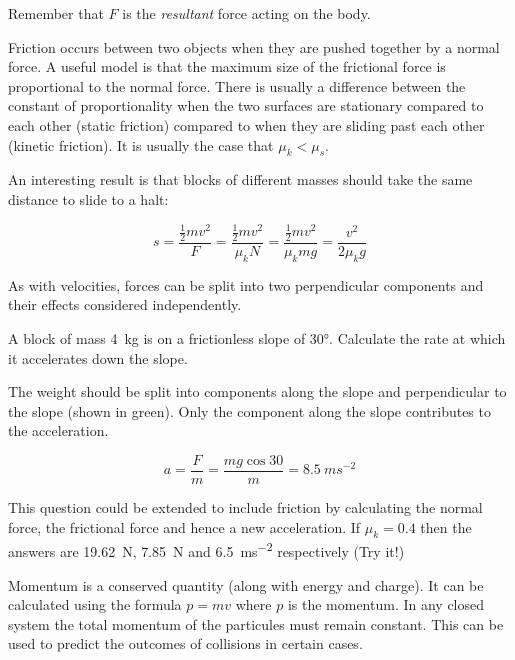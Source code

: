 \documentclass[main.tex]{subfiles}
\begin{document}

Remember that $F$ is the \emph{resultant} force acting on the body.



Friction occurs between two objects when they are pushed together by a normal force. A useful model is that the maximum size of the frictional force is proportional to the normal force. There is usually a difference between the constant of proportionality when the two surfaces are stationary compared to each other (static friction) compared to when they are sliding past each other (kinetic friction). It is usually the case that $\mu_k < \mu_s$.

An interesting result is that blocks of different masses should take the same distance to slide to a halt:

\[ s = \frac{\frac{1}{2}mv^2}{F} = \frac{\frac{1}{2}mv^2}{\mu_k N} = \frac{\frac{1}{2}mv^2}{\mu_k mg} = \frac{v^2}{2\mu_k g} \]


As with velocities, forces can be split into two perpendicular components and their effects considered independently.

\begin{example}
A block of mass \SI{4}{kg} is on a frictionless slope of \ang{30}. Calculate the rate at which it accelerates down the slope.


\answer

The weight should be split into components along the slope and perpendicular to the slope (shown in green). Only the component along the slope contributes to the acceleration.

\[ a = \frac{F}{m} = \frac{mg\cos{30}}{m} = \SI{8.5}{ms^{-2}} \]

This question could be extended to include friction by calculating the normal force, the frictional force and hence a new acceleration. If $\mu_k = 0.4$ then the answers are \SI{19.62}{N}, \SI{7.85}{N} and \SI{6.5}{ms^{-2}} respectively (Try it!)

\end{example}


Momentum is a conserved quantity (along with energy and charge). It can be calculated using the formula $p=mv$ where $p$ is the momentum. In any closed system the total momentum of the particules must remain constant. This can be used to predict the outcomes of collisions in certain cases.
\end{document}
